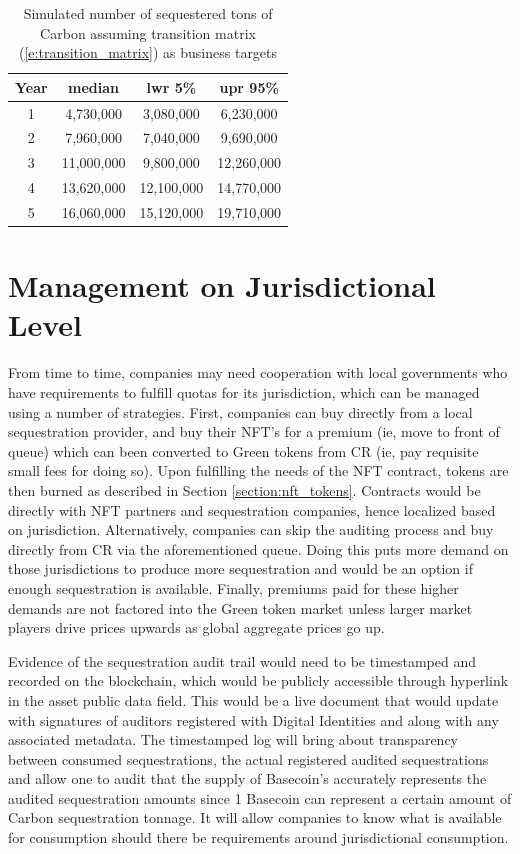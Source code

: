 \documentclass{article}
\begin{document}
\begin{table}[h]
\centering
\begin{tabular}{ |c|c|c|c| } 
\hline
 Year & median & lwr 5\% & upr 95\% \\
\hline
1 & 4,730,000 & 3,080,000 & 6,230,000 \\
2 & 7,960,000 & 7,040,000 & 9,690,000 \\
3 & 11,000,000 & 9,800,000 & 12,260,000 \\
4 & 13,620,000 & 12,100,000 & 14,770,000  \\
5 & 16,060,000 & 15,120,000 & 19,710,000 \\
\hline
\end{tabular}
\caption{Simulated number of sequestered tons of Carbon assuming transition matrix (\ref{e:transition_matrix}) as business targets}
\label{table:pow_vs_pos}
\end{table}




\section{Management on Jurisdictional Level}

From time to time, companies may need cooperation with local governments who have requirements to fulfill quotas for its jurisdiction, which can be managed using a number of strategies. First, companies can buy directly from a local sequestration provider, and buy their NFT’s for a premium (ie, move to front of queue) which can been converted to Green tokens from CR (ie, pay requisite small fees for doing so). Upon fulfilling the needs of the NFT contract, tokens are then burned as described in Section \ref{section:nft_tokens}. Contracts would be directly with NFT partners and sequestration companies, hence localized based on jurisdiction. Alternatively, companies can skip the auditing process and buy directly from CR via the aforementioned queue. Doing this puts more demand on those jurisdictions to produce more sequestration and would be an option if enough sequestration is available. Finally, premiums paid for these higher demands are not factored into the Green token market unless larger market players drive prices upwards as global aggregate prices go up.

Evidence of the sequestration audit trail would need to be timestamped and recorded on the blockchain, which would be publicly accessible through hyperlink in the asset public data field. This would be a live document that would update with signatures of auditors registered with Digital Identities and along with any associated metadata. The timestamped log will bring about transparency between consumed sequestrations, the actual registered audited sequestrations and allow one to audit that the supply of Basecoin’s accurately represents the audited sequestration amounts since 1 Basecoin can represent a certain amount of Carbon sequestration tonnage. It will allow companies to know what is available for consumption should there be requirements around jurisdictional consumption.
\end{document}
